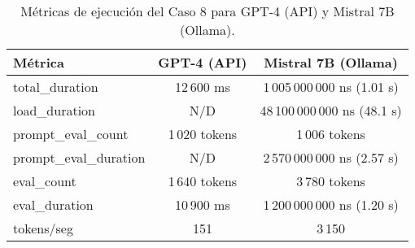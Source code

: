 
\begin{table}[h!]
\centering
\begin{tabular}{|l|c|c|}
\hline
\textbf{Métrica} & \textbf{GPT-4 (API)} & \textbf{Mistral 7B (Ollama)} \\
\hline
total\_duration & 12\,600 ms & 1\,005\,000\,000 ns (1.01 s) \\
load\_duration & N/D & 48\,100\,000\,000 ns (48.1 s) \\
prompt\_eval\_count & 1\,020 tokens & 1\,006 tokens \\
prompt\_eval\_duration & N/D & 2\,570\,000\,000 ns (2.57 s) \\
eval\_count & 1\,640 tokens & 3\,780 tokens \\
eval\_duration & 10\,900 ms & 1\,200\,000\,000 ns (1.20 s) \\
tokens/seg & 151 & 3\,150 \\
\hline
\end{tabular}
\caption{Métricas de ejecución del Caso 8 para GPT-4 (API) y Mistral 7B (Ollama).}
\end{table}
